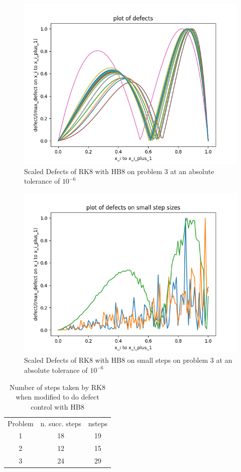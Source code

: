 \documentclass{article}
\begin{document}
\begin{figure}[H]
\centering
\includegraphics[width=0.7\linewidth]{./figures/rk8_with_hb8_p3_scaled_defects}
\caption{Scaled Defects of RK8 with HB8 on problem 3 at an absolute tolerance of $10^{-6}$}
\label{fig:rk8_with_hb8_p3_scaled_defects}
\end{figure}

\begin{figure}[H]
\centering
\includegraphics[width=0.7\linewidth]{./figures/rk8_with_hb8_p3_scaled_defects_small_steps}
\caption{Scaled Defects of RK8 with HB8 on small steps on problem 3 at an absolute tolerance of $10^{-6}$}
\label{fig:rk8_with_hb8_p3_scaled_defects_small_steps}
\end{figure}

\begin{table}[h]
\caption {Number of steps taken by RK8 when modified to do defect control with HB8} \label{tab:rk8_with_hb8_nsteps}
\begin{center}
\begin{tabular}{ c c c } 
Problem & n. succ. steps & nsteps \\ 
1       & 18             &        19 \\ 
2       & 12             &        15 \\
3       & 24             &        29 \\
\end{tabular}
\end{center}
\end{table}
\end{document}
